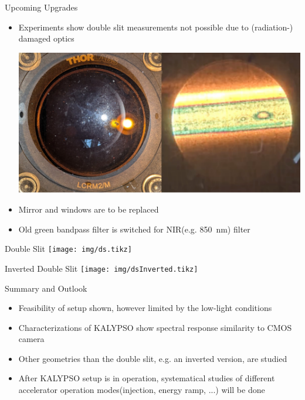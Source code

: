 \documentclass[english]{article}
\def\boxheight{200mm}
\def\boxsep{5mm}
\begin{document}
\begin{boxgrayw}[\boxheight]{Upcoming Upgrades}{}
	\begin{itemize}
		\item Experiments show double slit measurements not possible due to (radiation-) damaged optics
		
		\vspace{5mm}
		\begin{center}
			\includegraphics[width=145mm]{img/mirrorAndWindow.png}
		\end{center}
		\item Mirror and windows are to be replaced
		\item Old green bandpass filter is switched for NIR(e.g. \qty{850}{\nm}) filter
	\end{itemize}
\end{boxgrayw}
\vskip\boxsep
\begin{boxgrayw}[\boxheight]{Double Slit}{}
	\texttt{[image: img/ds.tikz]}
\end{boxgrayw}
\begin{boxgrayw}[\boxheight]{Inverted Double Slit}{}
	\texttt{[image: img/dsInverted.tikz]}
\end{boxgrayw}
\begin{boxgrayw}[\boxheight]{Summary and Outlook}{}
	\begin{itemize}
		\item Feasibility of setup shown, however limited by the low-light conditions
		\item Characterizations of KALYPSO show spectral response similarity to CMOS camera
		\item Other geometries than the double slit, e.g. an inverted version, are studied
		\item After KALYPSO setup is in operation, systematical studies of different accelerator operation modes(injection, energy ramp, ...) will be done
	\end{itemize}
\end{boxgrayw}
	
\end{document}
